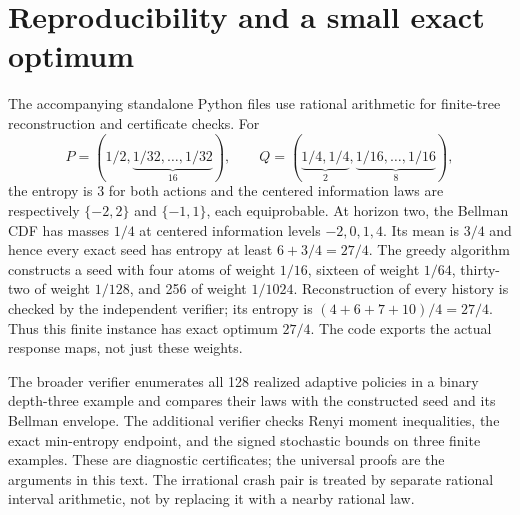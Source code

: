 \documentclass[11pt,a4paper]{article}
\begin{document}
\section{Reproducibility and a small exact optimum}\label{sec:reproduction}
The accompanying standalone Python files use rational arithmetic for
finite-tree reconstruction and certificate checks. For
\[
P=(1/2,\underbrace{1/32,\ldots,1/32}_{16}),\qquad
Q=(\underbrace{1/4,1/4}_{2},\underbrace{1/16,\ldots,1/16}_{8}),
\]
the entropy is $3$ for both actions and the centered information laws
are respectively $\{-2,2\}$ and $\{-1,1\}$, each equiprobable.
At horizon two, the Bellman CDF has masses $1/4$ at centered information
levels $-2,0,1,4$. Its mean is $3/4$ and hence every exact seed has
entropy at least $6+3/4=27/4$. The greedy algorithm constructs a seed
with four atoms of weight $1/16$, sixteen of weight $1/64$, thirty-two
of weight $1/128$, and 256 of weight $1/1024$. Reconstruction of every
history is checked by the independent verifier; its entropy is
$(4+6+7+10)/4=27/4$. Thus this finite instance has exact optimum $27/4$.
The code exports the actual response maps, not just these weights.

The broader verifier enumerates all 128 realized adaptive policies in a
binary depth-three example and compares their laws with the constructed
seed and its Bellman envelope. The additional verifier checks Renyi
moment inequalities, the exact min-entropy endpoint, and the signed
stochastic bounds on three finite examples. These are diagnostic
certificates; the universal proofs are the arguments in this text.
The irrational crash pair is treated by separate rational interval
arithmetic, not by replacing it with a nearby rational law.
\end{document}
